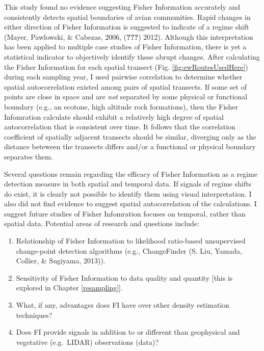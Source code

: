 \documentclass[12pt,twoside,openany]{reedthesis}
\providecommand{\tightlist}{%
  \setlength{\itemsep}{0pt}\setlength{\parskip}{0pt}}
\begin{document}
This study found no evidence suggesting Fisher Information accurately
and consistently detects spatial boundaries of avian communities. Rapid
changes in either direction of Fisher Information is suggested to
indicate of a regime shift (Mayer, Pawlowski, \& Cabezas, 2006,
({\textbf{???}}) 2012). Although this interpretation has been applied to
multiple case studies of Fisher Information, there is yet a statistical
indicator to objectively identify these abrupt changes. After
calculating the Fisher Information for each spatial transect (Fig.
\ref{fig:ewRoutesUsedHere}) during each sampling year, I used pairwise
correlation to determine whether spatial autocorrelation existed among
pairs of spatial transects. If some set of points are close in space and
are \emph{not} separated by some physical or functional boundary (e.g.,
an ecotone, high altitude rock formations), then the Fisher Infomration
calculate should exhibit a relatively high degree of spatial
autocorrelation that is consistent over time. It follows that the
correlation coefficient of spatially adjacent transects should be
similar, diverging only as the distance beteween the transects differs
and/or a functional or physical boundary separates them.

Several questions remain regarding the efficacy of Fisher Information as
a regime detection measure in both spatial and temporal data. If signals
of regime shifts do exist, it is clearly not possible to identify them
using visual interpretation. I also did not find evidence to suggest
spatial autocorrelation of the calculations. I suggest future studies of
Fisher Infomration focuses on temporal, rather than spatial data.
Potential areas of research and questions include:
\begin{enumerate}
\def\labelenumi{\arabic{enumi}.}
\tightlist
\item
  Relationship of Fisher Information to likelihood ratio-based
  unsupervised change-point detection algorithms (e.g., ChangeFinder (S.
  Liu, Yamada, Collier, \& Sugiyama, 2013)).\\
\item
  Sensitivity of Fisher Information to data quality and quantity {[}this
  is explored in Chapter \ref{resampling}{]}.\\
\item
  What, if any, advantages does FI have over other density estimation
  techniques?\\
\item
  Does FI provide signals in addition to or different than geophysical
  and vegetative (e.g.~LIDAR) observations (data)?
\end{enumerate}
\end{document}
